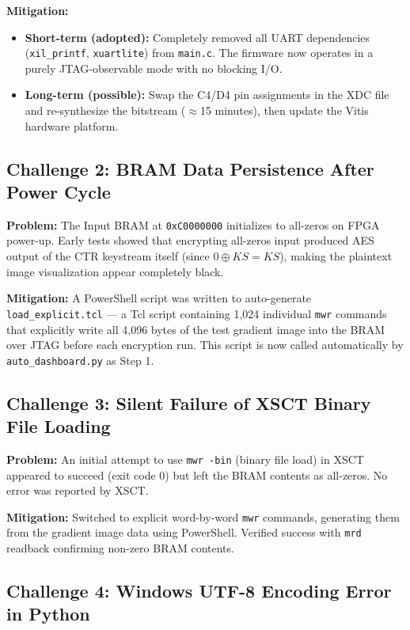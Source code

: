 \textbf{Mitigation:}
\begin{itemize}[leftmargin=*]
    \item \textbf{Short-term (adopted):} Completely removed all UART dependencies (\texttt{xil\_printf}, \texttt{xuartlite}) from \texttt{main.c}. The firmware now operates in a purely JTAG-observable mode with no blocking I/O.
    \item \textbf{Long-term (possible):} Swap the C4/D4 pin assignments in the XDC file and re-synthesize the bitstream ($\approx$15 minutes), then update the Vitis hardware platform.
\end{itemize}

\subsection{Challenge 2: BRAM Data Persistence After Power Cycle}

\textbf{Problem:} The Input BRAM at \texttt{0xC0000000} initializes to all-zeros on FPGA power-up. Early tests showed that encrypting all-zeros input produced AES output of the CTR keystream itself (since $0 \oplus KS = KS$), making the plaintext image visualization appear completely black.

\textbf{Mitigation:} A PowerShell script was written to auto-generate \texttt{load\_explicit.tcl} --- a Tcl script containing 1,024 individual \texttt{mwr} commands that explicitly write all 4,096 bytes of the test gradient image into the BRAM over JTAG before each encryption run. This script is now called automatically by \texttt{auto\_dashboard.py} as Step 1.

\subsection{Challenge 3: Silent Failure of XSCT Binary File Loading}

\textbf{Problem:} An initial attempt to use \texttt{mwr -bin} (binary file load) in XSCT appeared to succeed (exit code 0) but left the BRAM contents as all-zeros. No error was reported by XSCT.

\textbf{Mitigation:} Switched to explicit word-by-word \texttt{mwr} commands, generating them from the gradient image data using PowerShell. Verified success with \texttt{mrd} readback confirming non-zero BRAM contents.

\subsection{Challenge 4: Windows UTF-8 Encoding Error in Python}

